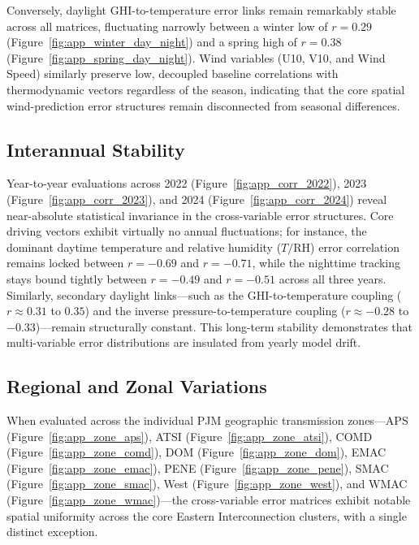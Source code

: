 Conversely, daylight GHI-to-temperature error links remain remarkably stable across all matrices, fluctuating narrowly between a winter low of $r = 0.29$ (Figure~\ref{fig:app_winter_day_night}) and a spring high of $r = 0.38$ (Figure~\ref{fig:app_spring_day_night}). Wind variables (U10, V10, and Wind Speed) similarly preserve low, decoupled baseline correlations with thermodynamic vectors regardless of the season, indicating that the core spatial wind-prediction error structures remain disconnected from seasonal differences.

\subsection{Interannual Stability}

Year-to-year evaluations across 2022 (Figure~\ref{fig:app_corr_2022}), 2023 (Figure~\ref{fig:app_corr_2023}), and 2024 (Figure~\ref{fig:app_corr_2024}) reveal near-absolute statistical invariance in the cross-variable error structures. Core driving vectors exhibit virtually no annual fluctuations; for instance, the dominant daytime temperature and relative humidity ($T/\text{RH}$) error correlation remains locked between $r = -0.69$ and $r = -0.71$, while the nighttime tracking stays bound tightly between $r = -0.49$ and $r = -0.51$ across all three years. Similarly, secondary daylight links—such as the GHI-to-temperature coupling ($r \approx 0.31$ to $0.35$) and the inverse pressure-to-temperature coupling ($r \approx -0.28$ to $-0.33$)—remain structurally constant. This long-term stability demonstrates that multi-variable error distributions are insulated from yearly model drift.


\subsection{Regional and Zonal Variations}

When evaluated across the individual PJM geographic transmission zones—APS (Figure~\ref{fig:app_zone_aps}), ATSI (Figure~\ref{fig:app_zone_atsi}), COMD (Figure~\ref{fig:app_zone_comd}), DOM (Figure~\ref{fig:app_zone_dom}), EMAC (Figure~\ref{fig:app_zone_emac}), PENE (Figure~\ref{fig:app_zone_pene}), SMAC (Figure~\ref{fig:app_zone_smac}), West (Figure~\ref{fig:app_zone_west}), and WMAC (Figure~\ref{fig:app_zone_wmac})—the cross-variable error matrices exhibit notable spatial uniformity across the core Eastern Interconnection clusters, with a single distinct exception.

